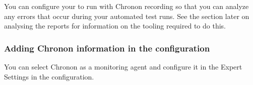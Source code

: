 You can configure your \gdaut{} to run with Chronon recording so that you can analyze any errors that occur during your automated test runs. See the section later  on analysing the reports for information on the tooling required to do this.


\subsubsection{Adding Chronon information in the \gdaut{} configuration}
You can select Chronon as a monitoring agent and configure it in the Expert Settings in the \gdaut{} configuration. 

